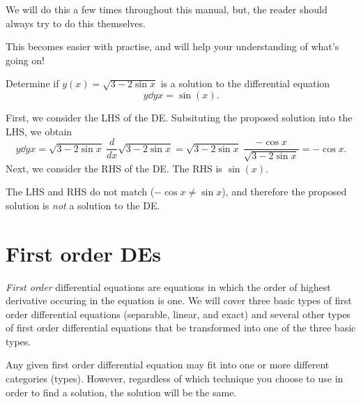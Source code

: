 \documentclass{book}
\begin{document}
We will do this a few times throughout this manual, but, the reader
should always try to do this themselves.

This becomes easier with practise, and will help your understanding of
what's going on!

\begin{example*}
  Determine if $y(x) = \sqrt{3-2\sin x}$ is a solution to the
  differential equation
  \begin{dmath*}
    y \dd{y}{x} = \sin(x).
  \end{dmath*}
\end{example*}

\begin{solution}
  First, we consider the LHS of the DE.  Subsituting the proposed
  solution into the LHS, we obtain
  \begin{dmath*}
    y \dd{y}{x} = \sqrt{3-2\sin x}\ \frac{d}{dx} \sqrt{3-2\sin x}
                = \sqrt{3-2\sin x}\ \frac{-\cos x}{\sqrt{3-2\sin x}}
                = - \cos x.
  \end{dmath*}
  Next, we consider the RHS of the DE.  The RHS is $\sin(x)$.

  The LHS and RHS do not match ($-\cos x \neq \sin x$), and therefore
  the proposed solution is \emph{not} a solution to the DE.
\end{solution}


\newpage
\chapter{First order DEs}

\emph{First order} differential equations are equations in which the
order of highest derivative occuring in the equation is one.  We will
cover three basic types of first order differential equations
(separable, linear, and exact) and several other types of first order
differential equations that be transformed into one of the three basic
types.

\begin{heads}
  Any given first order differential equation may fit into one or more
  different categories (types).  However, regardless of which
  technique you choose to use in order to find a solution, the
  solution will be the same.
\end{heads}


\newpage
\end{document}
